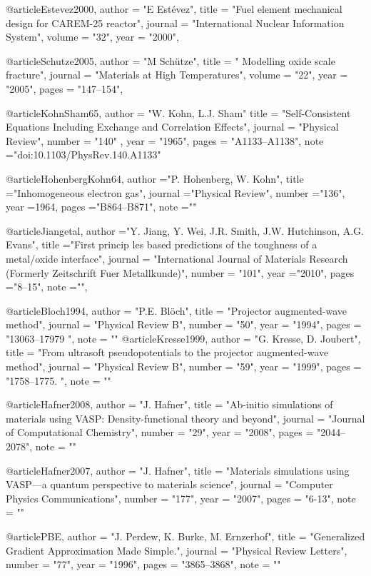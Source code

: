  @article{Estevez2000,
    author = "E Estévez",
    title  = "Fuel element mechanical design for CAREM-25 reactor",
    journal = "International Nuclear Information System",
    volume = "32",
    year   = "2000",
    }

@article{Schutze2005,
      author   = "M Schütze",
      title    = " Modelling oxide scale fracture",
      journal  = "Materials at High Temperatures",
      volume   = "22",
      year     = "2005",
      pages    = "147–154",
      }

@article{KohnSham65,
  author  = "W. Kohn,  L.J. Sham"
  title   = "Self-Consistent Equations Including Exchange and Correlation Effects",
  journal = "Physical Review",
  number  = "140" ,
  year    =  "1965",
  pages   = "A1133–A1138",
  note    ="doi:10.1103/PhysRev.140.A1133"
}          


@article{HohenbergKohn64,
  author  ="P. Hohenberg, W. Kohn",
  title   ="Inhomogeneous electron gas",
  journal ="Physical Review",
  number  ="136",
  year    =1964,
  pages   ="B864–B871",
  note    =""
}          


@article{Jiangetal,
  author  ="Y. Jiang, Y. Wei, J.R. Smith, J.W. Hutchinson, A.G. Evans", 
  title   ="First princip les based predictions of the toughness of a metal/oxide interface",
  journal = "International Journal of Materials Research (Formerly Zeitschrift Fuer Metallkunde)",
  number  = "101",
  year    ="2010",
  pages   ="8–15",
  note    ="",
}          

@article{Bloch1994,
  author  = "P.E. Blöch",
  title   = "Projector augmented-wave method",
  journal = "Physical Review B",
  number  = "50",
  year    = "1994",
  pages   = "13063–17979 ",
  note    = ""
}          
@article{Kresse1999,
  author  = "G. Kresse, D. Joubert",
  title   = "From ultrasoft pseudopotentials to the projector augmented-wave method",
  journal = "Physical Review B",
  number  = "59",
  year    = "1999",
  pages   = "1758–1775. ",
  note    = ""
}          

@article{Hafner2008,
  author  = "J. Hafner",
  title   = "Ab-initio simulations of materials using VASP: Density-functional theory and beyond",
  journal = "Journal of Computational Chemistry",
  number  = "29",
  year    = "2008",
  pages   = "2044–2078",
  note    = ""
}          

@article{Hafner2007,
  author  = "J. Hafner",
  title   = "Materials simulations using VASP—a quantum perspective to materials science",
  journal = "Computer Physics Communications",
  number  = "177",
  year    = "2007",
  pages   = "6-13",
  note    = ""
}

@article{PBE,
  author  = "J. Perdew, K. Burke, M. Ernzerhof",
  title   = "Generalized Gradient Approximation Made Simple.",
  journal = "Physical Review Letters",
  number  = "77",
  year    = "1996",
  pages   = "3865–3868",
  note    = ""
}          


